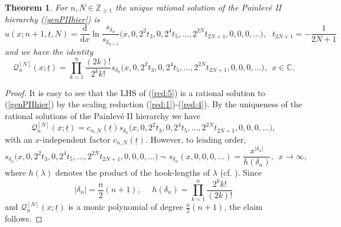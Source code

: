 \documentclass[10pt,reqno,oneside]{amsart}
\renewcommand{\d}{{\mathrm d}}
\numberwithin{equation}{section}
\newtheorem{theo}{Theorem}[section]
\def\un{\underline}
\def\eqref#1{(\ref{#1})}
\begin{document}
\begin{theo} For $n,N\in\mathbb{Z}_{\geq 1}$ the unique rational solution of the Painlev\'e II hierarchy \eqref{genPIIhier} is
\begin{equation}\label{red:5}
	u(x;n+1,\un t,N)=\frac{\d}{\d x}\ln\frac{s_{\delta_n}}{s_{\delta_{n+1}}}\big(x,0,2^2t_3,0,2^4t_5,\ldots,2^{2N}t_{2N+1},0,0,0,\ldots\big),\ \ \ t_{2N+1}=-\frac{1}{2N+1}
\end{equation}
and we have the identity
\begin{equation*}
	\mathcal{Q}_n^{[N]}(x;\un t)=\prod_{k=1}^n\frac{(2k)!}{2^kk!}s_{\delta_n}\big(x,0,2^2t_3,0,2^4t_5,\ldots,2^{2N}t_{2N+1},0,0,0,\ldots),\ \ x\in\mathbb{C}.
\end{equation*}
\end{theo}
\begin{proof} It is easy to see that the LHS of \eqref{red:5} is a rational solution to \eqref{genPIIhier} by the scaling reduction \eqref{red:1}-\eqref{red:4}. By the uniqueness of the rational solutions of the Painlev\'e II hierarchy we have 
\begin{equation*}
	\mathcal{Q}_n^{[N]}(x;\un t) = c_{n,N}(\un t)s_{\delta_n}\big(x,0,2^2t_3,0,2^4t_5,\ldots,2^{2N}t_{2N+1},0,0,0,\ldots\big),
\end{equation*}
with an $x$-independent factor $c_{n,N}(\un t)$. However, to leading order,
\begin{equation*}
	s_{\delta_n}\big(x,0,2^2t_3,0,2^4t_5,\ldots,2^{2N}t_{2N+1},0,0,0,\ldots\big)\sim s_{\delta_n}(x,0,0,0,\ldots)=\frac{x^{|\delta_n|}}{h(\delta_n)},\ \ x\rightarrow\infty,
\end{equation*}
where $h(\lambda)$ denotes the product of the hook-lengths of $\lambda$ (cf. \cite{M}). Since
\begin{equation*}
	|\delta_n|=\frac{n}{2}(n+1),\ \ \ \ \ \ h(\delta_n)=\prod_{k=1}^n\frac{2^kk!}{(2k)!}
\end{equation*}
and $\mathcal{Q}_n^{[N]}(x;\un t)$ is a monic polynomial of degree $\frac{n}{2}(n+1)$, the claim follows.
\end{proof}
\end{document}
